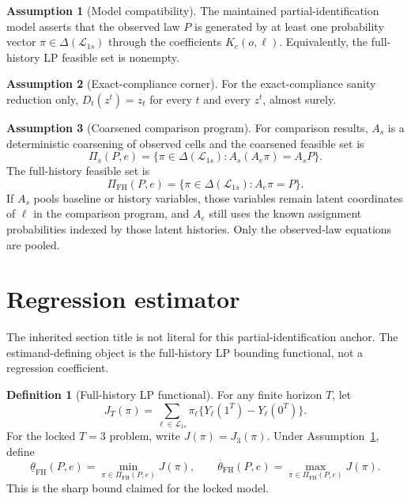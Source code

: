 \documentclass[11pt]{article}
\theoremstyle{definition}
\newtheorem{definition}{Definition}
\newtheorem{assumption}{Assumption}
\theoremstyle{plain}
\theoremstyle{remark}
\begin{document}
\begin{assumption}[Model compatibility]\label{ass:s0-compatibility}
The maintained partial-identification model asserts that the observed law \(P\) is generated by at least one probability vector \(\pi\in\Delta(\mathcal L_{1s})\) through the coefficients \(K_e(o,\ell)\).  Equivalently, the full-history LP feasible set is nonempty.
\end{assumption}

\begin{assumption}[Exact-compliance corner]\label{ass:s0-exact-compliance}
For the exact-compliance sanity reduction only, \(D_t(z^t)=z_t\) for every \(t\) and every \(z^t\), almost surely.
\end{assumption}

\begin{assumption}[Coarsened comparison program]\label{ass:s0-coarsening}
For comparison results, \(A_s\) is a deterministic coarsening of observed cells and the coarsened feasible set is
\[
\Pi_s(P,e)=\{\pi\in\Delta(\mathcal L_{1s}):A_s(A_e\pi)=A_sP\}.
\]
The full-history feasible set is
\[
\Pi_{\mathrm{FH}}(P,e)=\{\pi\in\Delta(\mathcal L_{1s}):A_e\pi=P\}.
\]
If \(A_s\) pools baseline or history variables, those variables remain
latent coordinates of \(\ell\) in the comparison program, and \(A_e\) still
uses the known assignment probabilities indexed by those latent histories.
Only the observed-law equations are pooled.
\end{assumption}

\section{Regression estimator}
The inherited section title is not literal for this partial-identification anchor.  The estimand-defining object is the full-history LP bounding functional, not a regression coefficient.

\begin{definition}[Full-history LP functional]\label{def:s0-fh-lp}
For any finite horizon \(T\), let
\[
J_T(\pi)=
\sum_{\ell\in\mathcal L_{1s}}\pi_\ell
\{Y_\ell(1^T)-Y_\ell(0^T)\}.
\]
For the locked \(T=3\) problem, write \(J(\pi)=J_3(\pi)\).
Under Assumption~\ref{ass:s0-compatibility}, define
\[
\underline\theta_{\mathrm{FH}}(P,e)=\min_{\pi\in\Pi_{\mathrm{FH}}(P,e)}J(\pi),
\qquad
\overline\theta_{\mathrm{FH}}(P,e)=\max_{\pi\in\Pi_{\mathrm{FH}}(P,e)}J(\pi).
\]
This is the sharp bound claimed for the locked model.
\end{definition}
\end{document}
